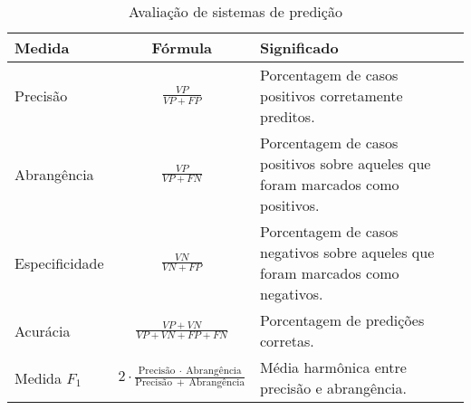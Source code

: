 



\begin{table}[H]
\begin{center}
    \caption{Avaliação de sistemas de predição}
    \label{tab:avaliacao-predicao}
    \begin{tabular}{ | l | c | p{5cm} | }
    \hline
    \textbf{Medida} & \textbf{Fórmula} & \textbf{Significado} \\ \hline
    Precisão &  $\frac{VP}{VP+FP}$ & Porcentagem de casos positivos corretamente preditos. \\ \hline                            
    Abrangência & $\frac{VP}{VP+FN}$ & Porcentagem de casos positivos sobre aqueles que foram marcados como positivos. \\ \hline
    Especificidade & $\frac{VN}{VN+FP}$ &  Porcentagem de casos negativos sobre aqueles que foram marcados como negativos. \\ \hline
    Acurácia & $\frac{VP+VN}{VP+VN+FP+FN}$ & Porcentagem de predições corretas. \\ \hline
    Medida $F_1$ &  $2 \cdot \frac{\mathrm{Precisão}~\cdot~\mathrm{Abrangência}}{\mathrm{Precisão}~+~\mathrm{Abrangência}}$ & Média harmônica entre precisão e abrangência. \\ \hline
    \end{tabular}
\end{center}
\end{table}


